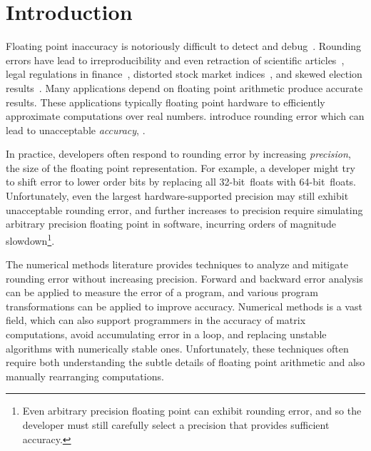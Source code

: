 \documentclass[paper.tex]{subfiles}
\begin{document}
\section{Introduction}
\label{sec:introduction}

Floating point inaccuracy is notoriously difficult to detect and
debug~\cite{berkeley00-needle-like, kahan-java-hurts}.  Rounding
errors have lead to irreproducibility and even retraction of
scientific articles~\cite{num-issues-in-stat, num-replication,
  stat-robustness}, legal regulations in finance~\cite{euro-rounding},
distorted stock market indices~\cite{distort-stock,
  wall-street-distort-stock}, and skewed election
results~\cite{round-elections}.
Many applications  depend on floating point arithmetic
 produce accurate results.  These applications typically 
floating point hardware to efficiently approximate computations over
real numbers.  
introduce rounding error\jdiff{}{,} which can lead to unacceptable
\textit{accuracy}, .


In practice, developers often respond to rounding error by increasing
\textit{precision}, the size of the floating point representation.
For example, a developer might try to shift error to lower order bits
by replacing all 32-bit~floats with 64-bit~floats.  Unfortunately, even the largest
hardware-supported precision may still exhibit unacceptable rounding
error, and further increases to precision require simulating arbitrary
precision floating point in software, incurring orders of magnitude
slowdown\footnote{Even arbitrary precision floating point can exhibit
  rounding error, and so the developer must still carefully select a
  precision that provides sufficient accuracy.}.

The numerical methods literature provides techniques to analyze and
mitigate rounding error without increasing precision.  Forward and
backward error analysis  can be applied to measure the
error of a program, and various program transformations 
can be applied to improve accuracy.  Numerical methods is a vast
field, which can also support programmers in the accuracy of matrix
computations, avoid accumulating error in a loop, and replacing
unstable algorithms with numerically stable ones.  Unfortunately,
these techniques often require both understanding the subtle details
of floating point arithmetic and also manually rearranging
computations.
\end{document}
